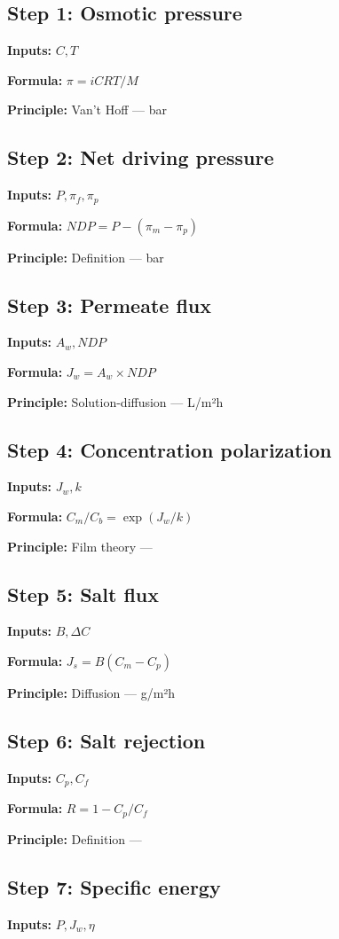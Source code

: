 \documentclass[11pt,twocolumn]{article}
\begin{document}
\subsection*{Step 1: Osmotic pressure}
\textbf{Inputs:} $C, T$

\textbf{Formula:} $\pi = iCRT/M$

\textbf{Principle:} Van't Hoff --- bar

\subsection*{Step 2: Net driving pressure}
\textbf{Inputs:} $P, \pi_f, \pi_p$

\textbf{Formula:} $NDP = P - (\pi_m - \pi_p)$

\textbf{Principle:} Definition --- bar

\subsection*{Step 3: Permeate flux}
\textbf{Inputs:} $A_w, NDP$

\textbf{Formula:} $J_w = A_w \times NDP$

\textbf{Principle:} Solution-diffusion --- L/m²h

\subsection*{Step 4: Concentration polarization}
\textbf{Inputs:} $J_w, k$

\textbf{Formula:} $C_m/C_b = \exp(J_w/k)$

\textbf{Principle:} Film theory --- 

\subsection*{Step 5: Salt flux}
\textbf{Inputs:} $B, \Delta C$

\textbf{Formula:} $J_s = B(C_m - C_p)$

\textbf{Principle:} Diffusion --- g/m²h

\subsection*{Step 6: Salt rejection}
\textbf{Inputs:} $C_p, C_f$

\textbf{Formula:} $R = 1 - C_p/C_f$

\textbf{Principle:} Definition --- %

\subsection*{Step 7: Specific energy}
\textbf{Inputs:} $P, J_w, \eta$
\end{document}
